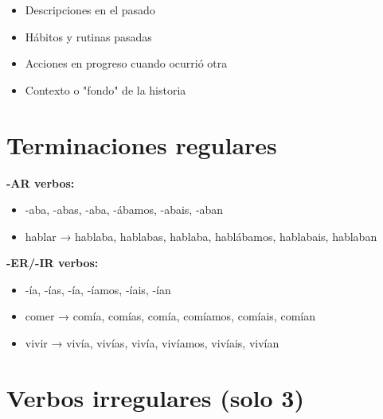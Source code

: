 \documentclass[a4paper,11pt]{article}
\begin{document}
\begin{itemize}

  \item Descripciones en el pasado

  \item Hábitos y rutinas pasadas

  \item Acciones en progreso cuando ocurrió otra

  \item Contexto o "fondo" de la historia

\end{itemize}

\vspace{0.2cm}

\section{Terminaciones regulares}

\vspace{0.2cm}

\textbf{-AR verbos:}

\begin{itemize}

  \item -aba, -abas, -aba, -ábamos, -abais, -aban

  \item hablar → hablaba, hablabas, hablaba, hablábamos, hablabais, hablaban

\end{itemize}

\vspace{0.2cm}

\textbf{-ER/-IR verbos:}

\begin{itemize}

  \item -ía, -ías, -ía, -íamos, -íais, -ían

  \item comer → comía, comías, comía, comíamos, comíais, comían

  \item vivir → vivía, vivías, vivía, vivíamos, vivíais, vivían

\end{itemize}

\vspace{0.2cm}

\section{Verbos irregulares (solo 3)}
\end{document}
